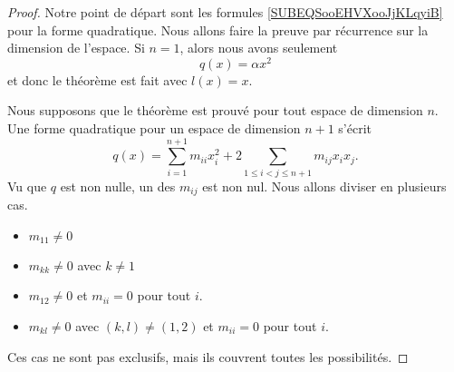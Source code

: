 \begin{proof}
	Notre point de départ sont les formules \eqref{SUBEQSooEHVXooJjKLqyiB} pour la forme quadratique. Nous allons faire la preuve par récurrence sur la dimension de l'espace. Si \( n=1\), alors nous avons seulement
	\begin{equation}
		q(x)=\alpha x^2
	\end{equation}
	et donc le théorème est fait avec \( l(x)=x\).

	Nous supposons que le théorème est prouvé pour tout espace de dimension \( n\). Une forme quadratique pour un espace de dimension \( n+1\) s'écrit
	\begin{equation}
		q(x)=\sum_{i=1}^{n+1}m_{ii}x_i^2+2\sum_{1\leq i < j\leq n+1}m_{ij}x_ix_j.
	\end{equation}
	Vu que \( q\) est non nulle, un des \( m_{ij}\) est non nul. Nous allons diviser en plusieurs cas.
	\begin{itemize}
		\item
		      \( m_{11}\neq 0\)
		\item
		      \( m_{kk}\neq 0\) avec \( k\neq 1\)
		\item
		      \( m_{12}\neq 0\) et \( m_{ii}=0\) pour tout \( i\).
		\item
		      \( m_{kl}\neq 0\) avec \( (k,l)\neq (1,2)\) et \( m_{ii}=0\) pour tout \( i\).
	\end{itemize}
	Ces cas ne sont pas exclusifs, mais ils couvrent toutes les possibilités.


\end{proof}
